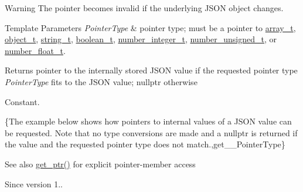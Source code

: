 \begin{DoxyWarning}{Warning}
The pointer becomes invalid if the underlying J\+S\+ON object changes.
\end{DoxyWarning}

\begin{DoxyTemplParams}{Template Parameters}
{\em Pointer\+Type} & pointer type; must be a pointer to \hyperlink{a00025_ab00b882d39306d663c23dab110f5cae0}{array\+\_\+t}, \hyperlink{a00025_a0ac9894c9de8dc551cf2e5f1c605537f}{object\+\_\+t}, \hyperlink{a00025_ab63e618bbb0371042b1bec17f5891f42}{string\+\_\+t}, \hyperlink{a00025_af3bc3e83aa162d7ba4df16a949872723}{boolean\+\_\+t}, \hyperlink{a00025_ac4b10b2364f26ce47bdb9a413ff04a59}{number\+\_\+integer\+\_\+t}, \hyperlink{a00025_a60a04166c122072ab11eaf9845d9cd1d}{number\+\_\+unsigned\+\_\+t}, or \hyperlink{a00025_a74a0013e847fdc574b48f931f0e757e1}{number\+\_\+float\+\_\+t}.\\
\hline
\end{DoxyTemplParams}
\begin{DoxyReturn}{Returns}
pointer to the internally stored J\+S\+ON value if the requested pointer type {\itshape Pointer\+Type} fits to the J\+S\+ON value; {\ttfamily nullptr} otherwise
\end{DoxyReturn}
Constant.

\{The example below shows how pointers to internal values of a J\+S\+ON value can be requested. Note that no type conversions are made and a {\ttfamily nullptr} is returned if the value and the requested pointer type does not match.,get\+\_\+\+\_\+\+Pointer\+Type\}

\begin{DoxySeeAlso}{See also}
\hyperlink{a00025_a7ab11375ed2e29c2fcb6119386851445}{get\+\_\+ptr()} for explicit pointer-\/member access
\end{DoxySeeAlso}
\begin{DoxySince}{Since}
version 1.. 
\end{DoxySince}
